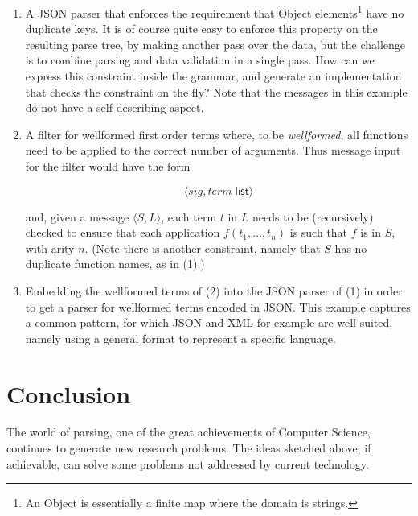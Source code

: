 \documentclass{article}
\newcommand{\konst}[1]{\ensuremath{\mathsf{#1}}}
\theoremstyle{definition}
\begin{document}
\begin{enumerate}

\item A JSON parser that enforces the requirement that \textsf{Object}
  elements\footnote{An \textsf{Object} is essentially a finite map
    where the domain is strings.} have no duplicate keys. It is of
  course quite easy to enforce this property on the resulting parse
  tree, by making another pass over the data, but the challenge is to
  combine parsing and data validation in a single pass. How can we
  express this constraint inside the grammar, and generate an
  implementation that checks the constraint on the fly? Note that the
  messages in this example do not have a self-describing aspect.

\item A filter for wellformed first order terms where, to be
  \emph{wellformed}, all functions need to be applied to the correct number
  of arguments. Thus message input for the filter would have the form

  \[ \langle \mathit{sig} , \mathit{term}\; \konst{list} \rangle \]

  and, given a message $\langle S, L \rangle$, each term $t$ in $L$
  needs to be (recursively) checked to ensure that each application
  $f(t_1,\ldots,t_n)$ is such that $f$ is in $S$, with arity $n$.
  (Note there is another constraint, namely that $S$ has no duplicate
  function names, as in (1).)

\item Embedding the wellformed terms of (2) into the JSON parser of
  (1) in order to get a parser for wellformed terms encoded in
  JSON. This example captures a common pattern, for which JSON and XML
  for example are well-suited, namely using a general format to
  represent a specific language.

\end{enumerate}

\section{Conclusion}

The world of parsing, one of the great achievements of Computer
Science, continues to generate new research problems. The ideas
sketched above, if achievable, can solve some problems not addressed
by current technology.



\end{document}
